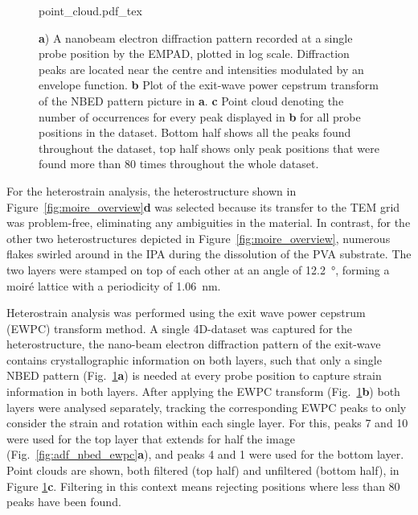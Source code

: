 \begin{figure}[t]
    \centering
    \def\svgwidth{.95\linewidth}
    {point_cloud.pdf_tex}
    \caption{\textbf{a}) A nanobeam electron diffraction pattern recorded at a single probe position by the EMPAD, plotted in log scale. Diffraction peaks are located near the centre and intensities modulated by an envelope function. \textbf{b} Plot of the exit-wave power cepstrum transform of the NBED pattern picture in \textbf{a}. \textbf{c} Point cloud denoting the number of occurrences for every peak displayed in \textbf{b} for all probe positions in the dataset. Bottom half shows all the peaks found throughout the dataset, top half shows only peak positions that were found more than 80 times throughout the whole dataset.}
    \label{fig:point_cloud}
\end{figure}

For the heterostrain analysis, the heterostructure shown in Figure~\ref{fig:moire_overview}\textbf{d} was selected because its transfer to the TEM grid was problem-free, eliminating any ambiguities in the material. In contrast, for the other two heterostructures depicted in Figure~\ref{fig:moire_overview}, numerous flakes swirled around in the IPA during the dissolution of the PVA substrate. The two layers were stamped on top of each other at an angle of \SI{12.2}{\degree}, forming a moiré lattice with a periodicity of \SI{1.06}{\nano\meter}.

Heterostrain analysis was performed using the exit wave power cepstrum (EWPC) transform method. A single 4D-dataset was captured for the heterostructure, the nano-beam electron diffraction pattern of the exit-wave contains crystallographic information on both layers, such that only a single NBED pattern (Fig.~\ref{fig:point_cloud}\textbf{a}) is needed at every probe position to capture strain information in both layers. After applying the EWPC transform (Fig.~\ref{fig:point_cloud}\textbf{b}) both layers were analysed separately, tracking the corresponding EWPC peaks to only consider the strain and rotation within each single layer. For this, peaks 7 and 10 were used for the top layer that extends for half the image (Fig.~\ref{fig:adf_nbed_ewpc}\textbf{a}), and peaks 4 and 1 were used for the bottom layer. Point clouds are shown, both filtered (top half) and unfiltered (bottom half), in Figure \ref{fig:point_cloud}\textbf{c}. Filtering in this context means rejecting positions where less than 80 peaks have been found.

